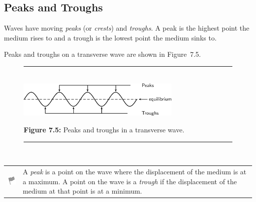             \subsection{ Peaks and Troughs}
            \nopagebreak
        \label{m38806*id317923}Waves have moving \textsl{peaks} (or \textsl{crests}) and \textsl{troughs}. A peak is the highest point the medium rises to and a trough is the lowest point the medium sinks to.\par 
        \label{m38806*id317942}Peaks and troughs on a transverse wave are shown in Figure~7.5.\par 
    \setcounter{subfigure}{0}
	\begin{figure}[H] %
    \begin{center}
    \rule[.1in]{\figurerulewidth}{.005in} \\
        \label{m38806*uid9!!!underscore!!!media}\label{m38806*uid9!!!underscore!!!printimage}\includegraphics[width=300px]{col11305.imgs/m38806_PG10C5_004.png} %
      \vspace{2pt}
    \vspace{\rubberspace}\par \begin{cnxcaption}
	  \small \textbf{Figure 7.5: }Peaks and troughs in a transverse wave.
	\end{cnxcaption}
    \vspace{.1in}
    \rule[.1in]{\figurerulewidth}{.005in} \\
    \end{center}
 \end{figure}       
\par
            \label{m38806*fhsst!!!underscore!!!id136}\begin{definition}
	  \begin{tabular*}{15 cm}{m{15 mm}m{}}
	\hspace*{-50pt}  \includegraphics[width=0.5in]{col11305.imgs/psflag2.png}   & \Definition{   \label{id2439255}\textbf{ Peaks and troughs }} { \label{m38806*meaningfhsst!!!underscore!!!id136}
        \label{m38806*id317968}A \textsl{peak} is a point on the wave where the displacement of the medium is at a maximum. A point on the wave is a \textsl{trough} if the displacement of the medium at that point is at a minimum.  \par 
         } 
      \end{tabular*}
      \end{definition}
      \label{m38806*uid10}
